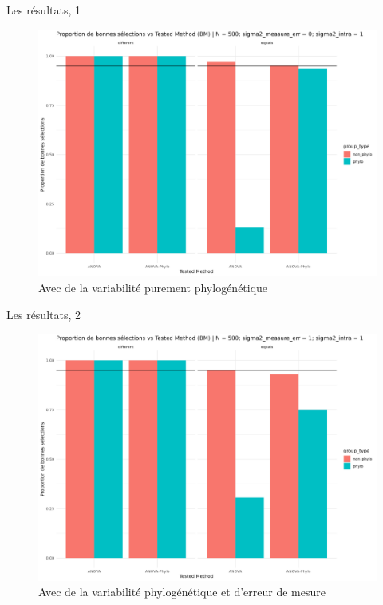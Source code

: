 \documentclass[10pt]{beamer}\usepackage[]{graphicx}\usepackage[]{xcolor}
\begin{document}
\begin{frame}[fragile]{Les résultats, 1}
\begin{figure}
    \centering
    \includegraphics[scale=0.32]{img/simulation_power_pure_BM.png}
    \caption{Avec de la variabilité purement phylogénétique}
    \label{fig:only_phylo_error}
\end{figure}
\end{frame}

\begin{frame}[fragile]{Les résultats, 2}
\begin{figure}
    \centering
    \includegraphics[scale=0.32]{img/simulation_power_pure_both_error.png}
    \caption{Avec de la variabilité phylogénétique et d'erreur de mesure}
    \label{fig:with_phylo_and_measure_error}
\end{figure}
\end{frame}
\end{document}
